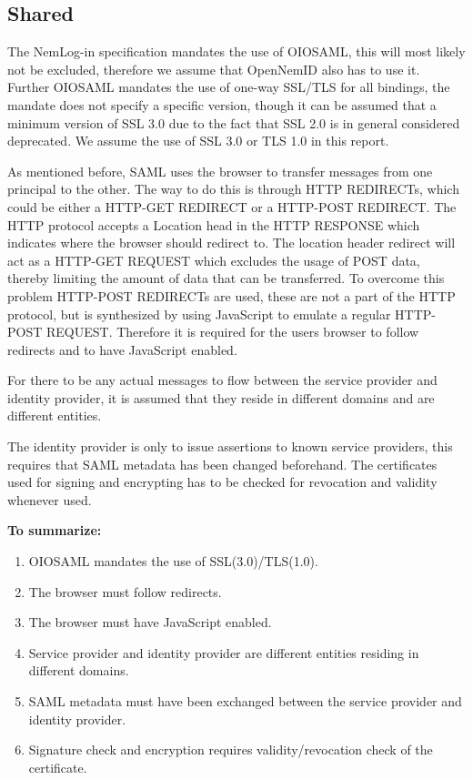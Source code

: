 \documentclass[twosided]{report}
\begin{document}
\subsection{Shared}
The NemLog-in specification mandates the use of OIOSAML, this will most likely not be excluded, therefore we assume that OpenNemID also has to use it. Further OIOSAML mandates the use of one-way SSL/TLS for all bindings, the mandate does not specify a specific version, though it can be assumed that a minimum version of SSL 3.0 due to the fact that SSL 2.0 is in general considered deprecated. We assume the use of SSL 3.0 or TLS 1.0 in this report.
\par
As mentioned before, SAML uses the browser to transfer messages from one principal to the other. The way to do this is through HTTP REDIRECTs, which could be either a HTTP-GET REDIRECT or a HTTP-POST REDIRECT. The HTTP protocol accepts a Location head in the HTTP RESPONSE which indicates where the browser should redirect to. The location header redirect will act as a HTTP-GET REQUEST which excludes the usage of POST data, thereby limiting the amount of data that can be transferred. To overcome this problem HTTP-POST REDIRECTs are used, these are not a part of the HTTP protocol, but is synthesized by using JavaScript to emulate a regular HTTP-POST REQUEST. Therefore it is required for the users browser to follow redirects and to have JavaScript enabled.
\par
For there to be any actual messages to flow between the service provider and identity provider, it is assumed that they reside in different domains and are different entities.
\par
The identity provider is only to issue assertions to known service providers, this requires that SAML metadata has been changed beforehand. The certificates used for signing and encrypting has to be checked for revocation and validity whenever used.
\\
\par
\textbf{To summarize:}
\begin{enumerate}
	\item OIOSAML mandates the use of SSL(3.0)/TLS(1.0).
	\item The browser must follow redirects.
	\item The browser must have JavaScript enabled.
	\item Service provider and identity provider are different entities residing in different domains.
	\item SAML metadata must have been exchanged between the service provider and identity provider.
	\item Signature check and encryption requires validity/revocation check of the certificate.
\end{enumerate}
\end{document}
